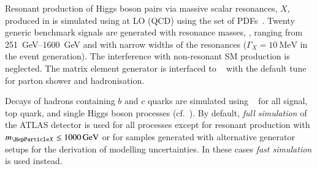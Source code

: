 Resonant production of Higgs boson pairs via massive scalar
resonances, $X$, produced in \ggF is simulated using \MGNLO at LO
(QCD) using the \NNPDF[2.3lo] set of PDFs~\cite{Ball:2012cx}. Twenty
generic benchmark signals are generated with resonance masses, \mX,
ranging from \SIrange{251}{1600}{\GeV} and with narrow widths of the
resonances ($\Gamma_{X} = \SI{10}{\MeV}$ in the event
generation). The interference with non-resonant SM \HH production is
neglected. The matrix element generator is interfaced to
\HERWIG[7.1]~\cite{Gieseke:2012ft,Bellm:2017jjp} with the default tune
for parton shower and hadronisation.

Decays of hadrons containing $b$ and $c$ quarks are simulated using
\EVTGEN~\cite{Lange:2001uf} for all signal, top quark, and single
Higgs boson processes (cf.~). By default,
\emph{full simulation} of the ATLAS detector is used for all processes
except for resonant \HH production with $\mX \leq \SI{1000}{\GeV}$ or
for samples generated with alternative generator setups for the
derivation of modelling uncertainties. In these cases \emph{fast
  simulation} is used instead.

